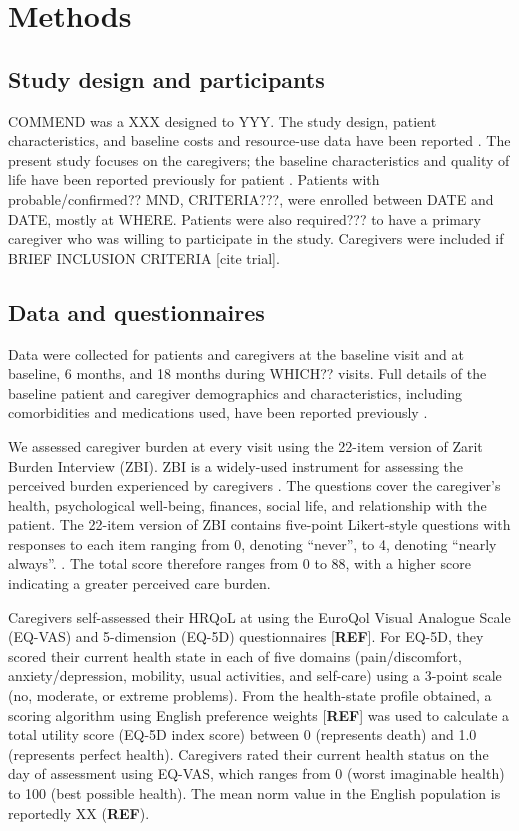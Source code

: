 \documentclass[12pt]{article}
\begin{document}
\section*{Methods}

\subsection*{Study design and participants}
COMMEND was a XXX designed to YYY. The study design, patient
characteristics, and baseline costs and resource-use data
have been reported \parencite{gould_randomised_2022}. The present study focuses on the caregivers; the baseline characteristics and quality of life have been reported previously for patient  \parencite{gould_acceptance_2024}. Patients with
probable/confirmed?? MND, CRITERIA???, were enrolled between
DATE and DATE, mostly at WHERE. Patients were
also required??? to have a primary caregiver who was
willing to participate in the study. Caregivers were included if BRIEF INCLUSION CRITERIA [cite trial]. 

\subsection*{Data and questionnaires}
Data were collected for patients and caregivers at the
baseline visit and at baseline, 6 months, and 18 months during WHICH?? visits. Full details of the baseline patient and caregiver
demographics and characteristics, including comorbidities
and medications used, have been reported previously \parencite{gould_acceptance_2024, keetharuth_costeffectiveness_2024}.

We assessed caregiver burden at every visit using the 22-item version of Zarit Burden Interview (ZBI). ZBI is a widely-used instrument for assessing the perceived burden experienced by caregivers \parencite{zarit_relatives_1980}. The questions cover the caregiver’s health, psychological well-being, finances, social life, and relationship with the patient. The 22-item version of ZBI contains five-point Likert-style questions with responses to each item ranging from 0, denoting “never”, to 4, denoting “nearly always”. \parencite{zarit_hidden_1985}. The total score therefore ranges from 0 to 88, with a higher score indicating a greater perceived care burden. 

Caregivers self-assessed their HRQoL at using the EuroQol Visual Analogue Scale (EQ-VAS) and 5-dimension (EQ-5D) questionnaires [\textbf{REF}]. For EQ-5D, they scored their current health state in each of five domains (pain/discomfort, anxiety/depression, mobility, usual activities, and self-care) using a 3-point scale (no, moderate, or extreme problems). From the health-state profile obtained, a scoring algorithm using English preference weights [\textbf{REF}] was used to calculate a total utility score (EQ-5D index score) between 0 (represents death) and 1.0 (represents perfect health). Caregivers rated their current health status on the day of assessment using EQ-VAS, which ranges from 0 (worst imaginable health) to 100 (best possible health). The mean norm value in the English population is reportedly XX (\textbf{REF}). 
\end{document}
